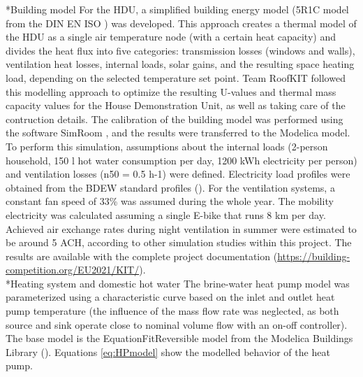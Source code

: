 \documentclass[twocolumn, a4paper,10pt]{article}
\makeatletter
\renewcommand\subsection{\@startsection{subsection}{1}{\z@}{\z@}{\z@}{\normalfont\normalsize\bfseries}}
\renewcommand\subsection{\@startsection{subsection}{1}{\z@}{\z@}{0.1pt}{\normalfont\normalsize\bfseries}}
\makeatother
\begin{document}
\subsection*{Building model}
For the HDU, a simplified building energy model (5R1C model from the DIN EN ISO \citet{DIN13790}) was developed. This approach creates a thermal model of the HDU as a single air temperature node (with a certain heat capacity) and divides the heat flux into five categories: transmission losses (windows and walls), ventilation heat losses, internal loads, solar gains, and the resulting space heating load, depending on the selected temperature set point. Team RoofKIT followed this modelling approach to optimize the resulting U-values and thermal mass capacity values for the House Demonstration Unit, as well as taking care of the contruction details. The calibration of the building model was performed using the software SimRoom \citeyear {SimRoom2022}, and the results were transferred to the Modelica model. To perform this simulation, assumptions about the internal loads (2-person household, 150 l hot water consumption per day, 1200 kWh electricity per person) and ventilation losses (n50 = 0.5 h-1) were defined. Electricity load profiles were obtained from the BDEW standard profiles (\citet{BDEW2002}). For the ventilation systems, a constant fan speed of 33\% was assumed during the whole year. The mobility electricity was calculated assuming a single E-bike that runs 8 km per day. Achieved air exchange rates during night ventilation in summer were estimated to be around 5 ACH, according to other simulation studies within this project. The results are available with the complete project documentation (\textcolor{blue}{\url{https://building-competition.org/EU2021/KIT/}}).\\

\subsection*{Heating system and domestic hot water}
The brine-water heat pump model was parameterized using a characteristic curve based on the inlet and outlet heat pump temperature (the influence of the mass flow rate was neglected, as both source and sink operate close to nominal volume flow with an on-off controller). The base model is the EquationFitReversible model from the Modelica Buildings Library (\cite{Wetter2014}). Equations \ref{eq:HPmodel} show the modelled behavior of the heat pump. 
\vspace{-0.5pt}
\end{document}
